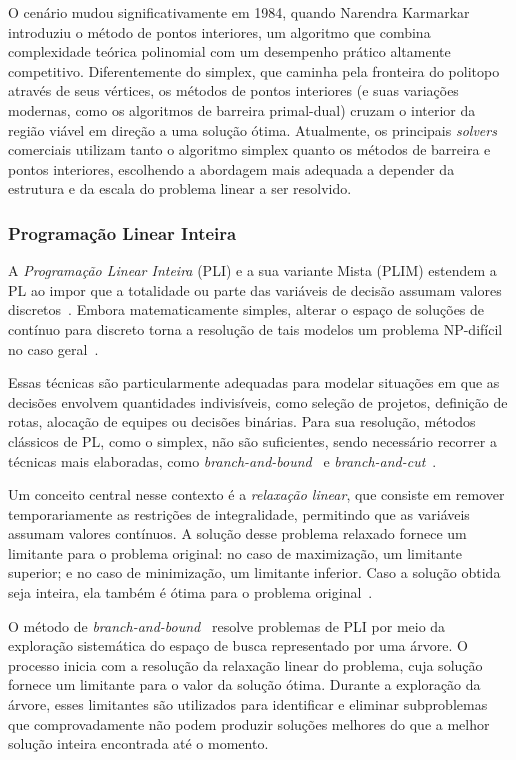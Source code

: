 \documentclass[11pt]{article}
\begin{document}
O cenário mudou significativamente em 1984, quando Narendra Karmarkar~\cite{karmarkar1984} introduziu o método de pontos interiores, um algoritmo que combina complexidade teórica polinomial com um desempenho prático altamente competitivo. Diferentemente do simplex, que caminha pela fronteira do politopo através de seus vértices, os métodos de pontos interiores (e suas variações modernas, como os algoritmos de barreira primal-dual) cruzam o interior da região viável em direção a uma solução ótima. Atualmente, os principais \emph{solvers} comerciais utilizam tanto o algoritmo simplex quanto os métodos de barreira e pontos interiores, escolhendo a abordagem mais adequada a depender da estrutura e da escala do problema linear a ser resolvido.

\subsubsection{Programação Linear Inteira}

A \textit{Programação Linear Inteira} (PLI) e a sua variante Mista (PLIM) estendem a PL ao impor que a totalidade ou parte das variáveis de decisão assumam valores discretos~\cite{Nemhauser1988}. Embora matematicamente simples, alterar o espaço de soluções de contínuo para discreto torna a resolução de tais modelos um problema NP-difícil no caso geral~\cite{Schrijver1986}.

Essas técnicas são particularmente adequadas para modelar situações em que as decisões envolvem quantidades indivisíveis, como seleção de projetos, definição de rotas, alocação de equipes ou decisões binárias. Para sua resolução, métodos clássicos de PL, como o simplex, não são suficientes, sendo necessário recorrer a técnicas mais elaboradas, como \emph{branch-and-bound}~\cite{Wosley1998} e \emph{branch-and-cut}~\cite{Bertsimas2005}.

Um conceito central nesse contexto é a \emph{relaxação linear}, que consiste em remover temporariamente as restrições de integralidade, permitindo que as variáveis assumam valores contínuos. A solução desse problema relaxado fornece um limitante para o problema original: no caso de maximização, um limitante superior; e no caso de minimização, um limitante inferior. Caso a solução obtida seja inteira, ela também é ótima para o problema original~\cite{Nemhauser1988}.

O método de \emph{branch-and-bound}~\cite{Wosley1998} resolve problemas de PLI por meio da exploração sistemática do espaço de busca representado por uma árvore. O processo inicia com a resolução da relaxação linear do problema, cuja solução fornece um limitante para o valor da solução ótima. Durante a exploração da árvore, esses limitantes são utilizados para identificar e eliminar subproblemas que comprovadamente não podem produzir soluções melhores do que a melhor solução inteira encontrada até o momento.
\end{document}
